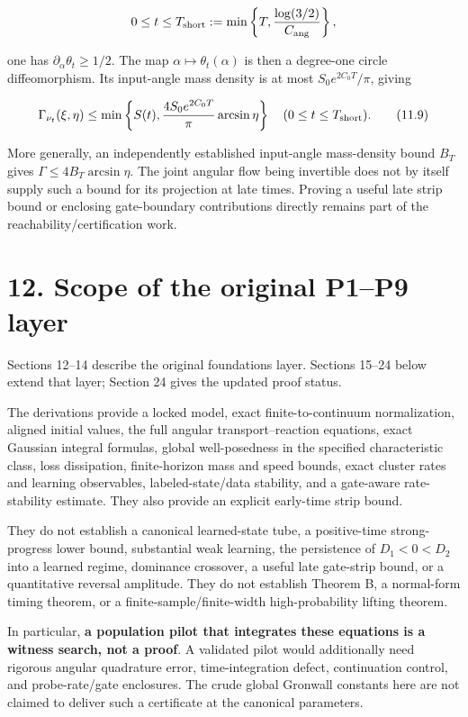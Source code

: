 \documentclass[
  10pt,
]{article}
\begin{document}
\[
 0\le t\le T_{\rm short}:=
 \min\left\{T,\frac{\log(3/2)}{C_{\rm ang}}\right\},
\]

one has \(\partial_\alpha\theta_t\ge1/2\). The map
\(\alpha\mapsto\theta_t(\alpha)\) is then a degree-one circle
diffeomorphism. Its input-angle mass density is at most
\(S_0e^{2C_0T}/\pi\), giving

\[
 \Gamma_{\nu_t}(\xi,\eta)
 \le\min\left\{S(t),\frac{4S_0e^{2C_0T}}{\pi}\arcsin\eta\right\}
 \quad(0\le t\le T_{\rm short}).
 \tag{11.9}
\]

More generally, an independently established input-angle mass-density
bound \(B_T\) gives \(\Gamma\le4B_T\arcsin\eta\). The joint angular flow
being invertible does not by itself supply such a bound for its
projection at late times. Proving a useful late strip bound or enclosing
gate-boundary contributions directly remains part of the
reachability/certification work.

\section{12. Scope of the original P1--P9
layer}\label{scope-of-the-original-p1p9-layer}

Sections 12--14 describe the original foundations layer. Sections 15--24
below extend that layer; Section 24 gives the updated proof status.

The derivations provide a locked model, exact finite-to-continuum
normalization, aligned initial values, the full angular
transport--reaction equations, exact Gaussian integral formulas, global
well-posedness in the specified characteristic class, loss dissipation,
finite-horizon mass and speed bounds, exact cluster rates and learning
observables, labeled-state/data stability, and a gate-aware
rate-stability estimate. They also provide an explicit early-time strip
bound.

They do not establish a canonical learned-state tube, a positive-time
strong-progress lower bound, substantial weak learning, the persistence
of \(D_1<0<D_2\) into a learned regime, dominance crossover, a useful
late gate-strip bound, or a quantitative reversal amplitude. They do not
establish Theorem B, a normal-form timing theorem, or a
finite-sample/finite-width high-probability lifting theorem.

In particular, \textbf{a population pilot that integrates these
equations is a witness search, not a proof}. A validated pilot would
additionally need rigorous angular quadrature error, time-integration
defect, continuation control, and probe-rate/gate enclosures. The crude
global Gronwall constants here are not claimed to deliver such a
certificate at the canonical parameters.
\end{document}
